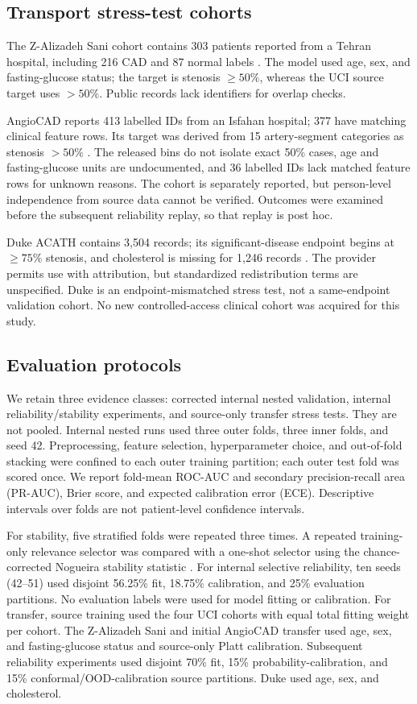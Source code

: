 \documentclass[conference]{IEEEtran}
\begin{document}
\subsection{Transport stress-test cohorts}
The Z-Alizadeh Sani cohort contains 303 patients reported from a Tehran hospital, including 216 CAD and 87 normal labels \cite{alizadehsani2013cad,uciz}. The model used age, sex, and fasting-glucose status; the target is stenosis $\geq 50\%$, whereas the UCI source target uses $>50\%$. Public records lack identifiers for overlap checks.

AngioCAD reports 413 labelled IDs from an Isfahan hospital; 377 have matching clinical feature rows. Its target was derived from 15 artery-segment categories as stenosis $>50\%$ \cite{angiocad2026,angiocadzenodo2025}. The released bins do not isolate exact 50\% cases, age and fasting-glucose units are undocumented, and 36 labelled IDs lack matched feature rows for unknown reasons. The cohort is separately reported, but person-level independence from source data cannot be verified. Outcomes were examined before the subsequent reliability replay, so that replay is post hoc.

Duke ACATH contains 3,504 records; its significant-disease endpoint begins at $\geq 75\%$ stenosis, and cholesterol is missing for 1,246 records \cite{dukeacath2026}. The provider permits use with attribution, but standardized redistribution terms are unspecified. Duke is an endpoint-mismatched stress test, not a same-endpoint validation cohort. No new controlled-access clinical cohort was acquired for this study.

\subsection{Evaluation protocols}
We retain three evidence classes: corrected internal nested validation, internal reliability/stability experiments, and source-only transfer stress tests. They are not pooled. Internal nested runs used three outer folds, three inner folds, and seed 42. Preprocessing, feature selection, hyperparameter choice, and out-of-fold stacking were confined to each outer training partition; each outer test fold was scored once. We report fold-mean ROC-AUC and secondary precision-recall area (PR-AUC), Brier score, and expected calibration error (ECE). Descriptive intervals over folds are not patient-level confidence intervals.

For stability, five stratified folds were repeated three times. A repeated training-only relevance selector was compared with a one-shot selector using the chance-corrected Nogueira stability statistic \cite{nogueira2018stability}. For internal selective reliability, ten seeds (42--51) used disjoint 56.25\% fit, 18.75\% calibration, and 25\% evaluation partitions. No evaluation labels were used for model fitting or calibration. For transfer, source training used the four UCI cohorts with equal total fitting weight per cohort. The Z-Alizadeh Sani and initial AngioCAD transfer used age, sex, and fasting-glucose status and source-only Platt calibration. Subsequent reliability experiments used disjoint 70\% fit, 15\% probability-calibration, and 15\% conformal/OOD-calibration source partitions. Duke used age, sex, and cholesterol.
\end{document}
